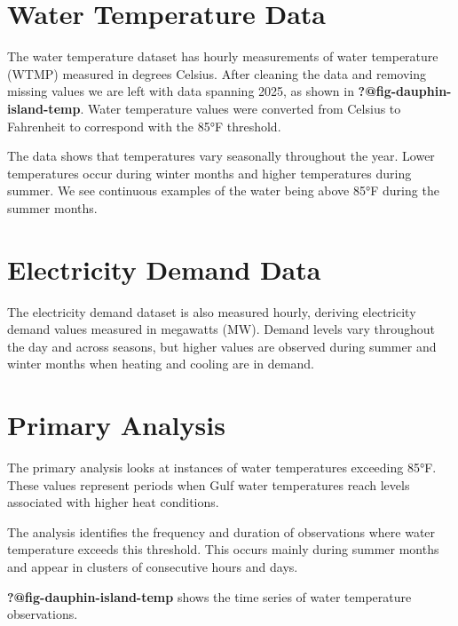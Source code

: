 \documentclass[
  letterpaper,
  DIV=11,
  numbers=noendperiod]{scrreprt}
\newenvironment{Shaded}{\begin{snugshade}}{\end{snugshade}}
\newcommand{\DecValTok}[1]{\textcolor[rgb]{0.68,0.00,0.00}{#1}}
\newcommand{\FunctionTok}[1]{\textcolor[rgb]{0.28,0.35,0.67}{#1}}
\newcommand{\NormalTok}[1]{\textcolor[rgb]{0.00,0.23,0.31}{#1}}
\newcommand{\SpecialCharTok}[1]{\textcolor[rgb]{0.37,0.37,0.37}{#1}}
\begin{document}
\section{Water Temperature Data}\label{water-temperature-data}

The water temperature dataset has hourly measurements of water
temperature (WTMP) measured in degrees Celsius. After cleaning the data
and removing missing values we are left with data spanning 2025, as
shown in \textbf{?@fig-dauphin-island-temp}. Water temperature values
were converted from Celsius to Fahrenheit to correspond with the 85°F
threshold.

The data shows that temperatures vary seasonally throughout the year.
Lower temperatures occur during winter months and higher temperatures
during summer. We see continuous examples of the water being above 85°F
during the summer months.

\section{Electricity Demand Data}\label{electricity-demand-data}

The electricity demand dataset is also measured hourly, deriving
electricity demand values measured in megawatts (MW). Demand levels vary
throughout the day and across seasons, but higher values are observed
during summer and winter months when heating and cooling are in demand.

\section{Primary Analysis}\label{primary-analysis}

The primary analysis looks at instances of water temperatures exceeding
85°F. These values represent periods when Gulf water temperatures reach
levels associated with higher heat conditions.

The analysis identifies the frequency and duration of observations where
water temperature exceeds this threshold. This occurs mainly during
summer months and appear in clusters of consecutive hours and days.

\textbf{?@fig-dauphin-island-temp} shows the time series of water
temperature observations.

\begin{Shaded}
\end{Shaded}
\end{document}
